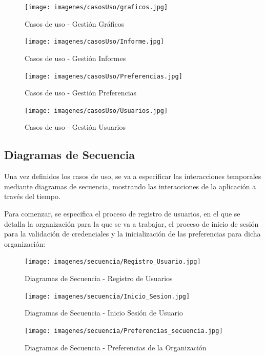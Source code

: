 \documentclass[a4paper,11pt]{book}
\begin{document}
\begin{figure}[H] 
\centering 
\texttt{[image: imagenes/casosUso/graficos.jpg]}
\caption{ Casos de uso - Gestión Gráficos  }  
\end{figure}


\begin{figure}[H] 
\centering 
\texttt{[image: imagenes/casosUso/Informe.jpg]}
\caption{ Casos de uso - Gestión Informes  }  
\end{figure}

\begin{figure}[H] 
\centering 
\texttt{[image: imagenes/casosUso/Preferencias.jpg]}
\caption{ Casos de uso - Gestión Preferencias  }  
\end{figure}

\begin{figure}[H] 
\centering 
\texttt{[image: imagenes/casosUso/Usuarios.jpg]}
\caption{ Casos de uso - Gestión Usuarios  }  
\end{figure}

\subsection{Diagramas de Secuencia}
Una vez definidos los casos de uso, se va a especificar las interacciones temporales mediante diagramas de secuencia, mostrando las interacciones de la aplicación a través del tiempo. 

Para comenzar, se especifica el proceso de registro de usuarios, en el que se detalla la organización para la que se va a trabajar, el proceso de inicio de sesión para la validación de credenciales y la inicialización de las preferencias para dicha organización:

\begin{figure}[H] 
\centering 
\texttt{[image: imagenes/secuencia/Registro\_Usuario.jpg]}
\caption{ Diagramas de Secuencia - Registro de Usuarios\cite{diagrama}  }  
\end{figure}

\begin{figure}[H] 
\centering 
\texttt{[image: imagenes/secuencia/Inicio\_Sesion.jpg]}
\caption{ Diagramas de Secuencia - Inicio Sesión de Usuario\cite{diagrama}  }  
\end{figure}

\begin{figure}[H] 
\centering 
\texttt{[image: imagenes/secuencia/Preferencias\_secuencia.jpg]}
\caption{ Diagramas de Secuencia - Preferencias de la Organización\cite{diagrama}  }  
\end{figure}
\end{document}
